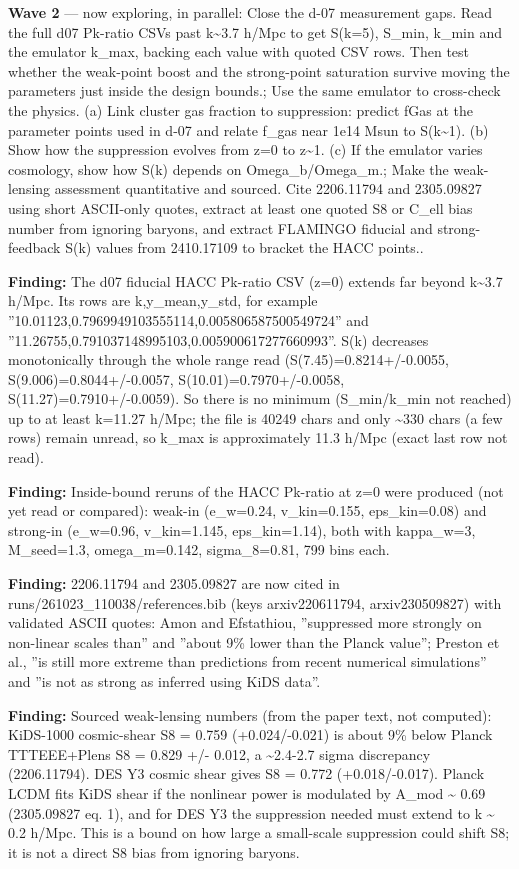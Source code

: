 \documentclass[11pt,a4paper]{article}
\begin{document}
\textbf{Wave 2} --- now exploring, in parallel: Close the d-07 measurement gaps. Read the full d07 Pk-ratio CSVs past k\textasciitilde{}3.7 h/Mpc to get S(k=5), S\_min, k\_min and the emulator k\_max, backing each value with quoted CSV rows. Then test whether the weak-point boost and the strong-point saturation survive moving the parameters just inside the design bounds.; Use the same emulator to cross-check the physics. (a) Link cluster gas fraction to suppression: predict fGas at the parameter points used in d-07 and relate f\_gas near 1e14 Msun to S(k\textasciitilde{}1). (b) Show how the suppression evolves from z=0 to z\textasciitilde{}1. (c) If the emulator varies cosmology, show how S(k) depends on Omega\_b/Omega\_m.; Make the weak-lensing assessment quantitative and sourced. Cite 2206.11794 and 2305.09827 using short ASCII-only quotes, extract at least one quoted S8 or C\_ell bias number from ignoring baryons, and extract FLAMINGO fiducial and strong-feedback S(k) values from 2410.17109 to bracket the HACC points..

\textbf{Finding:} The d07 fiducial HACC Pk-ratio CSV (z=0) extends far beyond k\textasciitilde{}3.7 h/Mpc. Its rows are k,y\_mean,y\_std, for example ''10.01123,0.7969949103555114,0.005806587500549724'' and ''11.26755,0.791037148995103,0.005900617277660993''. S(k) decreases monotonically through the whole range read (S(7.45)=0.8214+/-0.0055, S(9.006)=0.8044+/-0.0057, S(10.01)=0.7970+/-0.0058, S(11.27)=0.7910+/-0.0059). So there is no minimum (S\_min/k\_min not reached) up to at least k=11.27 h/Mpc; the file is 40249 chars and only \textasciitilde{}330 chars (a few rows) remain unread, so k\_max is approximately 11.3 h/Mpc (exact last row not read).

\textbf{Finding:} Inside-bound reruns of the HACC Pk-ratio at z=0 were produced (not yet read or compared): weak-in (e\_w=0.24, v\_kin=0.155, eps\_kin=0.08) and strong-in (e\_w=0.96, v\_kin=1.145, eps\_kin=1.14), both with kappa\_w=3, M\_seed=1.3, omega\_m=0.142, sigma\_8=0.81, 799 bins each.

\textbf{Finding:} 2206.11794 and 2305.09827 are now cited in runs/261023\_110038/references.bib (keys arxiv220611794, arxiv230509827) with validated ASCII quotes: Amon and Efstathiou, ''suppressed more strongly on non-linear scales than'' and ''about 9\% lower than the Planck value''; Preston et al., ''is still more extreme than predictions from recent numerical simulations'' and ''is not as strong as inferred using KiDS data''.

\textbf{Finding:} Sourced weak-lensing numbers (from the paper text, not computed): KiDS-1000 cosmic-shear S8 = 0.759 (+0.024/-0.021) is about 9\% below Planck TTTEEE+Plens S8 = 0.829 +/- 0.012, a \textasciitilde{}2.4-2.7 sigma discrepancy (2206.11794). DES Y3 cosmic shear gives S8 = 0.772 (+0.018/-0.017). Planck LCDM fits KiDS shear if the nonlinear power is modulated by A\_mod \textasciitilde{} 0.69 (2305.09827 eq. 1), and for DES Y3 the suppression needed must extend to k \textasciitilde{} 0.2 h/Mpc. This is a bound on how large a small-scale suppression could shift S8; it is not a direct S8 bias from ignoring baryons.
\end{document}
